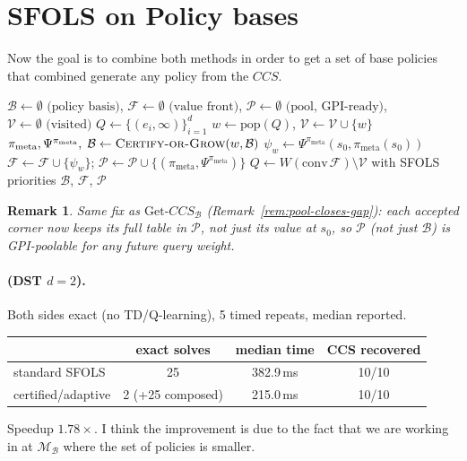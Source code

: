 \documentclass[11pt]{article}
\newtheorem{remark}{Remark}
\begin{document}
\section{SFOLS on Policy bases}

Now the goal is to combine both methods in order to get a set of base policies that combined generate any policy from the $CCS$.


\begin{algorithm}[H]
\caption{\textsc{SFOLS-Certified}}
\begin{algorithmic}[1]
\State $\mathcal{B}\gets\emptyset \text{ (policy basis)}$, \quad $\mathcal{F}\gets\emptyset \text{ (value front)}$, \quad $\mathcal P\gets\emptyset \text{ (pool, GPI-ready)}$, \quad $\mathcal{V}\gets\emptyset \text{ (visited)}$
\State $Q\gets\{(e_i,\infty)\}_{i=1}^{d}$
    \State $w\gets\mathrm{pop}(Q)$, \quad $\mathcal{V}\gets\mathcal{V}\cup\{w\}$
    \State $\pi_{\mathrm{meta}},\Psi^{\pi_{\mathrm{meta}}},\;\mathcal{B}\gets\textsc{Certify-or-Grow}(w,\mathcal{B})$
    \State $\psi_w\gets\Psi^{\pi_{\mathrm{meta}}}(s_0,\pi_{\mathrm{meta}}(s_0))$
        \State $\mathcal{F}\gets\mathcal{F}\cup\{\psi_w\}$; $\mathcal P\gets\mathcal P\cup\{(\pi_{\mathrm{meta}},\Psi^{\pi_{\mathrm{meta}}})\}$
        \State $Q\gets W(\mathrm{conv}\,\mathcal{F})\setminus\mathcal{V}$ with SFOLS priorities
    \EndIf
\EndWhile
\State \Return $\mathcal{B}$, $\mathcal{F}$, $\mathcal P$
\end{algorithmic}
\end{algorithm}

\begin{remark}
Same fix as $\mathrm{Get}\text{-}CCS_{\mathcal B}$ (Remark~\ref{rem:pool-closes-gap}): each accepted corner now keeps its full table in $\mathcal P$, not just its value at $s_0$, so $\mathcal P$ (not just $\mathcal B$) is GPI-poolable for any future query weight.
\end{remark}


\paragraph{(DST $d=2$).} Both sides exact (no TD/Q-learning), 5 timed
repeats, median reported.

\begin{center}
\begin{tabular}{lccc}
\toprule
 & exact solves & median time & CCS recovered \\
\midrule
standard SFOLS & 25 & 382.9\,ms & 10/10 \\
certified/adaptive & 2 (+25 composed) & 215.0\,ms & 10/10 \\
\bottomrule
\end{tabular}
\end{center}
Speedup $\mathbf{1.78\times}$. I think the improvement is due to the fact that we are working in at $\mathcal{M}_\mathcal{B}$ where the set of policies is smaller.
\end{document}
